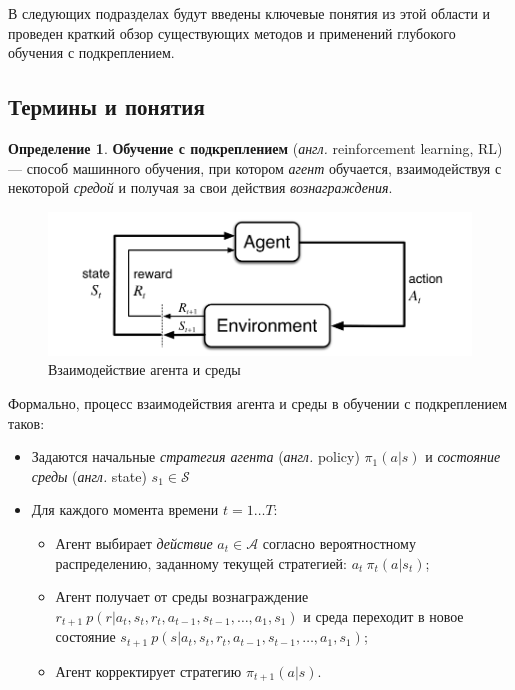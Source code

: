 \documentclass[specification,annotation,times]{itmo-student-thesis}
\theoremstyle{definition}
\newtheorem{definition-ru}{Определение}
\begin{document}
В следующих подразделах будут введены ключевые понятия из этой области и
проведен краткий обзор существующих методов и применений глубокого обучения с
подкреплением.

\subsection{Термины и понятия}

\begin{definition-ru}
  \textbf{Обучение с подкреплением} (\textit{англ.} reinforcement learning, RL)
  --- способ машинного обучения, при котором \textit{агент} обучается,
  взаимодействуя с некоторой \textit{средой} и получая за свои действия
  \textit{вознаграждения}.
\end{definition-ru}

\begin{figure}[!h]
  \caption{Взаимодействие агента и среды}\label{rl-scheme}
  \centering
  \includegraphics[scale=0.5]{rl-scheme}
\end{figure}

Формально, процесс взаимодействия агента и среды в обучении с подкреплением
таков:

\begin{itemize}
\item Задаются начальные \textit{стратегия агента} (\textit{англ.} policy)
  $\pi_1(a|s)$ и \textit{состояние среды} (\textit{англ.} state)
  $s_1 \in \mathcal{S}$
\item Для каждого момента времени $t = 1 \ldots T$:
  \begin{itemize}
  \item Агент выбирает \textit{действие} $a_t \in \mathcal{A}$ согласно
    вероятностному распределению, заданному текущей стратегией:
    $a_t ~ \pi_t(a | s_t)$;
  \item Агент получает от среды вознаграждение
    $r_{t+1} ~ p(r | a_t, s_t, r_t, a_{t-1}, s_{t-1}, \ldots, a_1, s_1)$ и
    среда переходит в новое состояние
    $s_{t+1} ~ p(s | a_t, s_t, r_t, a_{t-1}, s_{t-1}, \ldots, a_1, s_1)$;
  \item Агент корректирует стратегию $\pi_{t+1}(a | s)$.
  \end{itemize}
\end{itemize}
\end{document}
